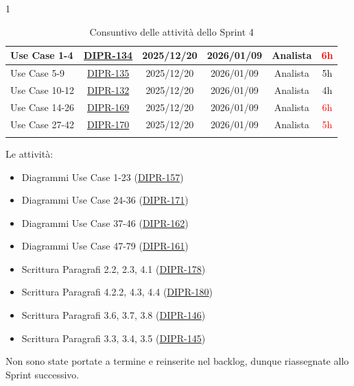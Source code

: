 \documentclass[a4paper,12pt]{article}
\begin{document}
\begin{spacing}{1}
\begin{longtable}{|p{4cm}|c|c|c|c|c|}
            \hline
            Use Case 1-4 & \href{https://7zpus.atlassian.net/browse/DIPR-134}{DIPR-134} & 2025/12/20 & 2026/01/09 & Analista & \textcolor{red}{6h}\\
            \hline
            Use Case 5-9 & \href{https://7zpus.atlassian.net/browse/DIPR-135}{DIPR-135} & 2025/12/20 & 2026/01/09 & Analista & 5h\\
            \hline
            Use Case 10-12 & \href{https://7zpus.atlassian.net/browse/DIPR-132}{DIPR-132} & 2025/12/20 & 2026/01/09 & Analista & \textcolor{green!50!black}{4h}\\
            \hline       
            Use Case 14-26& \href{https://7zpus.atlassian.net/browse/DIPR-169}{DIPR-169} & 2025/12/20 & 2026/01/09 & Analista & \textcolor{red}{6h} \\
            \hline
            Use Case 27-42& \href{https://7zpus.atlassian.net/browse/DIPR-170}{DIPR-170} & 2025/12/20 & 2026/01/09 & Analista & \textcolor{red}{5h} \\
            \hline
    \caption{Consuntivo delle attività dello Sprint 4}

        \end{longtable}
    \end{spacing}


Le attività:
    \begin{itemize}
        \item Diagrammi Use Case 1-23 (\href{https://7zpus.atlassian.net/browse/DIPR-157}{DIPR-157})
        \item Diagrammi Use Case 24-36 (\href{https://7zpus.atlassian.net/browse/DIPR-171}{DIPR-171})
        \item Diagrammi Use Case 37-46 (\href{https://7zpus.atlassian.net/browse/DIPR-162}{DIPR-162})
        \item Diagrammi Use Case 47-79 (\href{https://7zpus.atlassian.net/browse/DIPR-161}{DIPR-161})
        \item Scrittura Paragrafi 2.2, 2.3, 4.1 (\href{https://7zpus.atlassian.net/browse/DIPR-178}{DIPR-178})
        \item Scrittura Paragrafi 4.2.2, 4.3, 4.4 (\href{https://7zpus.atlassian.net/browse/DIPR-180}{DIPR-180})
        \item Scrittura Paragrafi 3.6, 3.7, 3.8 (\href{https://7zpus.atlassian.net/browse/DIPR-146}{DIPR-146})
        \item Scrittura Paragrafi 3.3, 3.4, 3.5 (\href{https://7zpus.atlassian.net/browse/DIPR-145}{DIPR-145})
    \end{itemize}
    Non sono state portate a termine e reinserite nel backlog, dunque riassegnate allo Sprint successivo.\\
\end{document}
